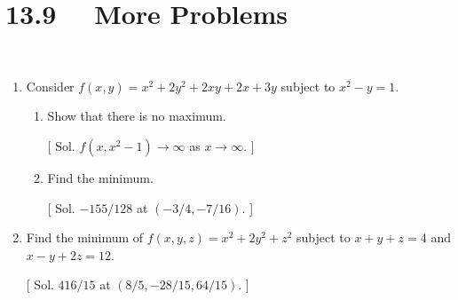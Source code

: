 

\section*{13.9 \ \ More Problems}

\ 


\begin{enumerate}
\item  Consider $f(x, y) = x^2 + 2y^2 + 2xy + 2x + 3y$ subject to $x^2 - y = 1$.  \\
\begin{enumerate}
\item  Show that there is no maximum.

[ Sol.  $f(x, x^2-1) \rightarrow \infty$ as $x \rightarrow \infty$. ]  \\

\item  Find the minimum.  

[ Sol.  $-155/128$ at $(-3/4, -7/16)$. ]  \\
\end{enumerate}

\item  Find the minimum of $f(x, y, z) = x^2 + 2y^2 + z^2$ subject to 
$x + y + z = 4$ and $x - y + 2z = 12$.

[ Sol. $416/15$ at $(8/5, -28/15, 64/15)$. ]  \\


\end{enumerate}